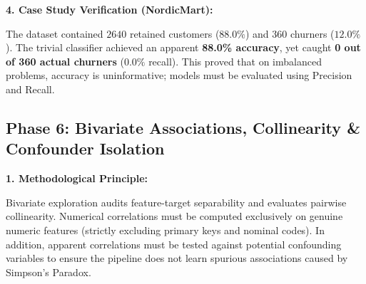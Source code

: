 \documentclass[11pt,a4paper]{article}
\begin{document}
\vspace{0.4em}
\noindent\textbf{4. Case Study Verification (NordicMart):}\par\vspace{0.2em}
The dataset contained $2640$ retained customers ($88.0\%$) and $360$ churners ($12.0\%$). The trivial classifier achieved an apparent \textbf{88.0\% accuracy}, yet caught \textbf{0 out of 360 actual churners} ($0.0\%$ recall). This proved that on imbalanced problems, accuracy is uninformative; models must be evaluated using Precision and Recall.

\subsection*{Phase 6: Bivariate Associations, Collinearity \& Confounder Isolation}

\noindent\textbf{1. Methodological Principle:}\par\vspace{0.2em}
Bivariate exploration audits feature-target separability and evaluates pairwise collinearity. Numerical correlations must be computed exclusively on genuine numeric features (strictly excluding primary keys and nominal codes). In addition, apparent correlations must be tested against potential confounding variables to ensure the pipeline does not learn spurious associations caused by Simpson's Paradox.
\end{document}

